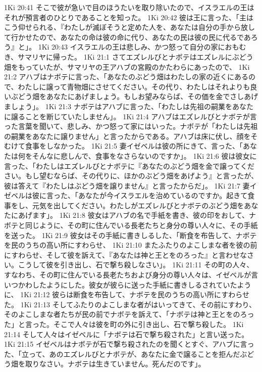 1Ki 20:41  そこで彼が急いで目のほうたいを取り除いたので、イスラエルの王はそれが預言者のひとりであることを知った。
1Ki 20:42  彼は王に言った、「主はこう仰せられる、『わたしが滅ぼそうと定めた人を、あなたは自分の手から放して行かせたので、あなたの命は彼の命に代り、あなたの民は彼の民に代るであろう』と」。
1Ki 20:43  イスラエルの王は悲しみ、かつ怒って自分の家におもむき、サマリヤに帰った。
1Ki 21:1  さてエズレルびとナボテはエズレルにぶどう畑をもっていたが、サマリヤの王アハブの宮殿のかたわらにあったので、
1Ki 21:2  アハブはナボテに言った、「あなたのぶどう畑はわたしの家の近くにあるので、わたしに譲って青物畑にさせてください。その代り、わたしはそれよりも良いぶどう畑をあなたにあげましょう。もしお望みならば、その価を金でさしあげましょう」。
1Ki 21:3  ナボテはアハブに言った、「わたしは先祖の嗣業をあなたに譲ることを断じていたしません」。
1Ki 21:4  アハブはエズレルびとナボテが言った言葉を聞いて、悲しみ、かつ怒って家にはいった。ナボテが「わたしは先祖の嗣業をあなたに譲りません」と言ったからである。アハブは床に伏し、顔をそむけて食事をしなかった。
1Ki 21:5  妻イゼベルは彼の所にきて、言った、「あなたは何をそんなに悲しんで、食事をなさらないのですか」。
1Ki 21:6  彼は彼女に言った、「わたしはエズレルびとナボテに『あなたのぶどう畑を金で譲ってください。もし望むならば、その代りに、ほかのぶどう畑をあげよう』と言ったが、彼は答えて『わたしはぶどう畑を譲りません』と言ったからだ」。
1Ki 21:7  妻イゼベルは彼に言った、「あなたが今イスラエルを治めているのですか。起きて食事をし、元気を出してください。わたしがエズレルびとナボテのぶどう畑をあなたにあげます」。
1Ki 21:8  彼女はアハブの名で手紙を書き、彼の印をおして、ナボテと同じように、その町に住んでいる長老たちと身分の尊い人々に、その手紙を送った。
1Ki 21:9  彼女はその手紙に書きしるした、「断食を布告して、ナボテを民のうちの高い所にすわらせ、
1Ki 21:10  またふたりのよこしまな者を彼の前にすわらせ、そして彼を訴えて、『あなたは神と王とをのろった』と言わせなさい。こうして彼を引き出し、石で撃ち殺しなさい」。
1Ki 21:11  その町の人々、すなわち、その町に住んでいる長老たちおよび身分の尊い人々は、イゼベルが言いつかわしたようにした。彼女が彼らに送った手紙に書きしるされていたように、
1Ki 21:12  彼らは断食を布告して、ナボテを民のうちの高い所にすわらせた。
1Ki 21:13  そしてふたりのよこしまな者がはいってきて、その前にすわり、そのよこしまな者たちが民の前でナボテを訴えて、「ナボテは神と王とをのろった」と言った。そこで人々は彼を町の外に引き出し、石で撃ち殺した。
1Ki 21:14  そして人々はイゼベルに「ナボテは石で撃ち殺された」と言い送った。
1Ki 21:15  イゼベルはナボテが石で撃ち殺されたのを聞くとすぐ、アハブに言った、「立って、あのエズレルびとナボテが、あなたに金で譲ることを拒んだぶどう畑を取りなさい。ナボテは生きていません。死んだのです」。
